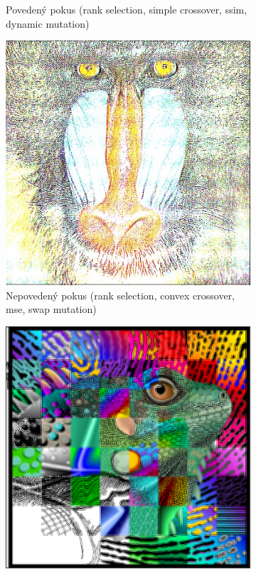 \documentclass[a4paper,11pt]{scrartcl}
\begin{document}
\begin{figure}[!ht]
\begin{subfigure}[b]{0.4\textwidth}
        \caption{Povedený pokus (rank selection, simple crossover, ssim, dynamic mutation)}
        \label{fig:gull}
    \end{subfigure}
        \begin{subfigure}[b]{0.4\textwidth}
        \includegraphics[width=\textwidth]{img/ranksel-convex-mse-swap_example1.jpg}
        \caption{Nepovedený pokus (rank selection, convex crossover, mse, swap mutation)}
        \label{fig:gull}
    \end{subfigure}
        \begin{subfigure}[b]{0.4\textwidth}
        \includegraphics[width=\textwidth]{img/example2_E.png}

\end{subfigure}
\end{figure}
\end{document}

